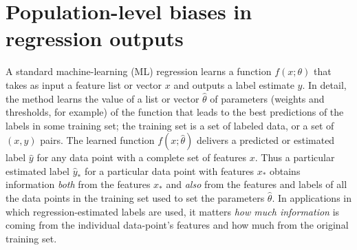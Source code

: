 \documentclass{article}
\begin{document}
\section{Population-level biases in regression outputs}\label{app:toy}
A standard machine-learning (ML) regression learns a function $f(x;\theta)$ that takes as input a feature list or vector $x$ and outputs a label estimate $y$.
In detail, the method learns the value of a list or vector $\hat{\theta}$ of parameters (weights and thresholds, for example) of the function that leads to the best predictions of the labels in some training set; the training set is a set of labeled data, or a set of $(x, y)$ pairs.
The learned function $f(x;\hat{\theta})$ delivers a predicted or estimated label $\hat{y}$ for any data point with a complete set of features $x$.
Thus a particular estimated label $\hat{y}_\ast$ for a particular data point with features $x_\ast$ obtains information \emph{both} from the features $x_\ast$ and \emph{also} from the features and labels of all the data points in the training set used to set the parameters $\hat{\theta}$.
In applications in which regression-estimated labels are used, it matters \emph{how much information} is coming from the individual data-point's features and how much from the original training set.
\end{document}
